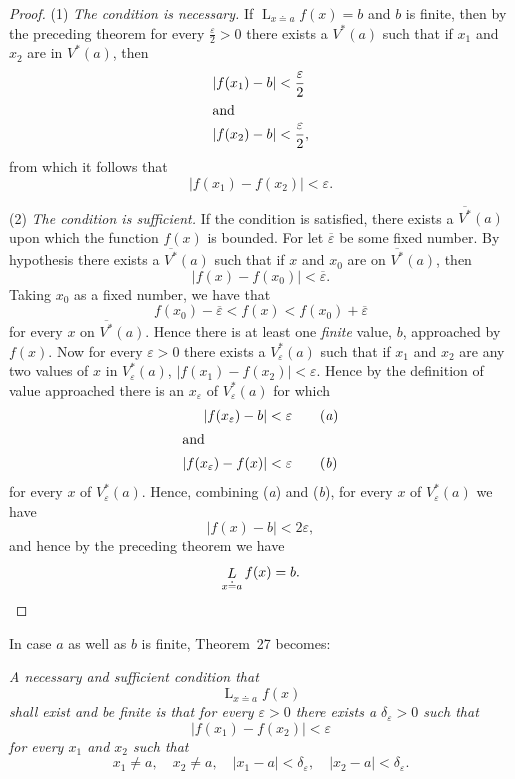 \documentclass[a4paper,12pt]{book}[2004/02/16]
\providecommand{\colorbox}[2]{#2}
\newcommand{\correction}[2]{\colorbox{corr}{#1}}
\providecommand{\hyperlink}[2]{#2}
\theoremstyle{ilemma}
\theoremstyle{itheorem}
\theoremstyle{iother}
\theoremstyle{icorollary}
\theoremstyle{numcorollary}
\theoremstyle{idefinition}
\begin{document}
\begin{proof}
(1) \textit{The condition is necessary.} If $\displaystyle\mathop{L}_{x\doteq a}
f(x)=b$ and $b$ is finite, then by the preceding theorem for every
$\frac{\varepsilon}{2}>0$ there exists a $V^*(a)$ such that if $x_1$
and $x_2$ are in $V^*(a)$, then
\begin{align*}
  |f(x_1)-b|&< \frac\varepsilon2 \\
\intertext{and}
  |f(x_2)-b|&< \frac\varepsilon2,
\end{align*}
from which it follows that
\[
  |f(x_1)-f(x_2)|< \varepsilon.
\]

(2) \textit{The condition is sufficient.} If the condition is
satisfied, there exists a $\overline{V^*}(a)$ upon which the
function $f(x)$ is bounded.
For let $\overline{\varepsilon}$ be some fixed number. By
hypothesis there exists a $\overline{V^*}(a)$ such that if $x$ and
$x_0$ are on $\overline{V^*}(a)$, then
\[
  |f(x)-f(x_0)|< \overline{\varepsilon}.
\]
Taking $x_0$ as a fixed number, we have that
\[
  f(x_0)-\overline{\varepsilon} < f(x) < f(x_0)
  + \overline{\varepsilon}
\]
for every $x$ on $\overline{V^*}(a)$. Hence there is at least one
\textit{finite} value, $b$, approached by $f(x)$. Now for every
$\varepsilon>0$ there exists a $V_\varepsilon^*(a)$ such that if $x_1$
and $x_2$ are any two \correction{values}{valves} of $x$ in
$V_\varepsilon^*(a)$, $|f(x_1)-f(x_2)|< \varepsilon$. Hence by the
definition of value approached there is an $x_\varepsilon$ of
$V_\varepsilon^*(a)$ for which
\begin{align*}
  |f(x_\varepsilon)-b|&< \varepsilon\tag{\textit{a}}\\
\intertext{and}
  |f(x_\varepsilon)-f(x)|&< \varepsilon\tag{\textit{b}}
\end{align*}
for every $x$ of $V_\varepsilon^*(a)$. Hence, combining (\textit{a})
and (\textit{b}), for every $x$ of $V_\varepsilon^*(a)$ we have
\[
  |f(x)-b|< 2\varepsilon,
\]
and hence by the preceding theorem we have
\[
  \mathop{L}_{x \doteq a} f(x)=b.\qedhere
\]
\end{proof}

In case $a$ as well as $b$ is finite, Theorem~\hyperlink{thm27}{27} becomes:

\textit{A necessary and sufficient condition that
\[
  \mathop{L}_{x\doteq a}f(x)
\]
shall exist and be finite is that for every $\varepsilon>0$ there
exists a $\delta_\varepsilon > 0$ such that
\[
  |f(x_1)-f(x_2)|<\varepsilon
\]
for every $x_1$ and $x_2$ such that
\[
  x_1 \neq a,\quad x_2\neq a,\quad
  |x_1-a|< \delta_\varepsilon,\quad
  |x_2-a|< \delta_\varepsilon.
\]}
\end{document}

